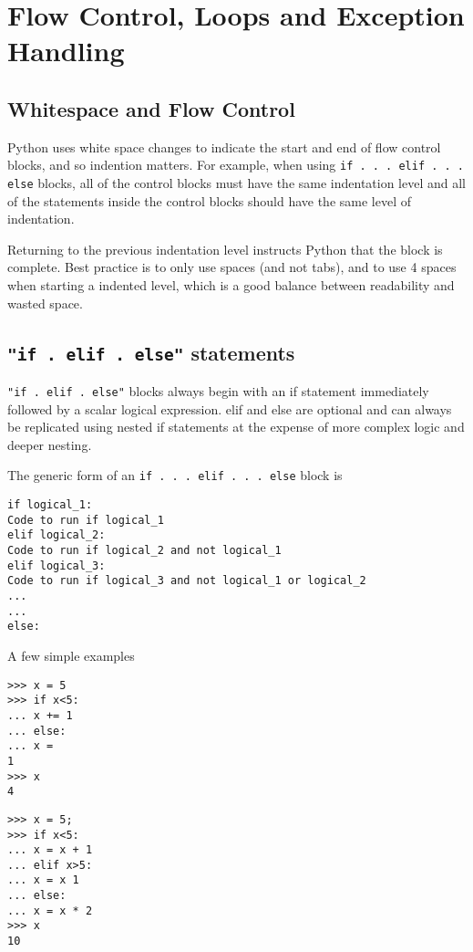 \documentclass[Pydata.tex]{subfiles}
\begin{document}
 
\section{Flow Control, Loops and Exception Handling}
\subsection{Whitespace and Flow Control}
Python uses white space changes to indicate the start and end of flow control blocks, and so indention
matters. For example, when using \texttt{if . . . elif . . . else} blocks, all of the control blocks must have the same
indentation level and all of the statements inside the control blocks should have the same level of indentation.

Returning to the previous indentation level instructs Python that the block is complete. Best practice
is to only use spaces (and not tabs), and to use 4 spaces when starting a indented level, which is a good
balance between readability and wasted space.
\subsection{\texttt{"if .  elif .  else"} statements}
\texttt{"if .  elif .  else"} blocks always begin with an if statement immediately followed by a scalar logical
expression. elif and else are optional and can always be replicated using nested if statements at the
expense of more complex logic and deeper nesting. 

\noindent The generic form of an \texttt{if . . . elif . . . else} block is

\begin{framed}
\begin{verbatim}
if logical_1:
Code to run if logical_1
elif logical_2:
Code to run if logical_2 and not logical_1
elif logical_3:
Code to run if logical_3 and not logical_1 or logical_2
...
...
else:
\end{verbatim}
\end{framed}
%
A few simple examples
\begin{framed}
	\begin{verbatim}>>> x = 5
>>> if x<5:
... x += 1
... else:
... x =
1
>>> x
4
\end{verbatim}
\end{framed}
\begin{framed}
\begin{verbatim}
>>> x = 5;
>>> if x<5:
... x = x + 1
... elif x>5:
... x = x 1
... else:
... x = x * 2
>>> x
10
\end{verbatim}
\end{framed}
\newpage
\end{document}
